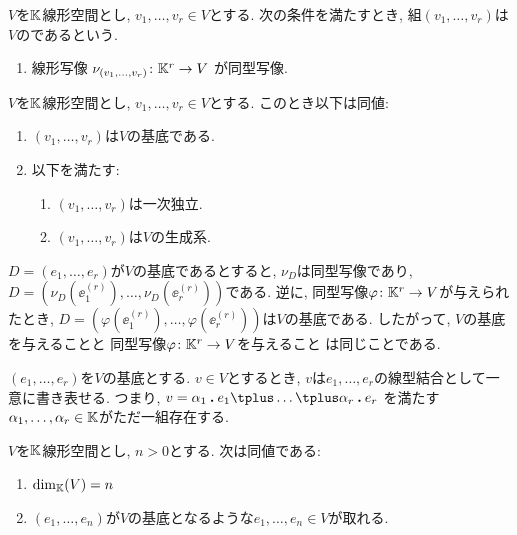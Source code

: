 \begin{definition}
  $V$を$\mathbb{K}$線形空間とし,
  $v_1,\ldots,v_r\in V$とする.
  次の条件を満たすとき,
  組$(v_1,\ldots,v_r)$は$V$のであるという.
\begin{enumerate}
  \item 線形写像 $\nu_{(v_1,\ldots,v_r)}\colon \mathbb{K}^r\to V$
    が同型写像.
  \end{enumerate}
\end{definition}
\begin{prop}
  $V$を$\mathbb{K}$線形空間とし,
  $v_1,\ldots,v_r\in V$とする.
  このとき以下は同値:
  \begin{enumerate}
  \item $(v_1,\ldots,v_r)$は$V$の基底である.
  \item 以下を満たす:
  \begin{enumerate}
    \item $(v_1,\ldots,v_r)$は一次独立.
  \item $(v_1,\ldots,v_r)$は$V$の生成系.
  \end{enumerate}
  \end{enumerate}
\end{prop}
\begin{remark}
  $D=(e_1,\ldots,e_r)$が$V$の基底であるとすると,
  $\nu_D$は同型写像であり,
  $D=(\nu_D(\ee^{(r)}_1),\ldots,\nu_D(\ee^{(r)}_r))$である.
  逆に, 同型写像$\varphi\colon \mathbb{K}^r\to V$が与えられたとき,
  $D=(\varphi(\ee^{(r)}_1),\ldots,\varphi(\ee^{(r)}_r))$は$V$の基底である.
  したがって,
  $V$の基底を与えることと
  同型写像$\varphi\colon \mathbb{K}^r\to V$を与えること
  は同じことである.
\end{remark}

\begin{prop}
  $(e_1,\ldots,e_r)$を$V$の基底とする.
  $v\in V$とするとき,
  $v$は$e_1,\ldots,e_r$の線型結合として一意に書き表せる.
  つまり,
  $v=\alpha_1\act e_1\plus \ldots\plus \alpha_r\act e_r$
  を満たす$\alpha_1,\ldots, \alpha_r\in\mathbb{K}$がただ一組存在する.
\end{prop}


\begin{lemma}
  $V$を$\mathbb{K}$線形空間とし, $n>0$とする.
  次は同値である:
  \begin{enumerate}
  \item $\dim_{\mathbb{K}}(V)=n$
  \item $(e_1,\ldots,e_n)$が$V$の基底となるような$e_1,\ldots,e_n\in V$が取れる.
  \end{enumerate}
\end{lemma}

